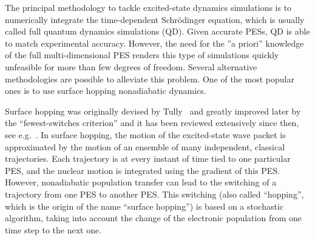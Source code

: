 \documentclass[a4paper,10pt,DIV=15,openany]{scrbook}
\begin{document}
The principal methodology to tackle excited-state dynamics simulations is to numerically integrate the time-dependent Schr\"odinger equation, which is usually called full quantum dynamics simulations (QD). Given accurate PESs, QD is able to match experimental accuracy. However, the need for the ''a priori'' knowledge of the full multi-dimensional PES renders this type of simulations quickly unfeasible for more than few degrees of freedom. Several alternative methodologies are possible to alleviate this problem. One of the most popular ones is to use surface hopping nonadiabatic dynamics.

Surface hopping was originally devised by Tully~\cite{Tully1971JCP} and greatly improved later by the ``fewest-switches criterion''\cite{Tully1990JCP} and it has been reviewed extensively since then, see e.g.~\cite{Barbatti2011WCMS,Subotnik2016ARPC,Wang2016JPCL,Doltsinis2006,Doltsinis2002JTCC}.
In surface hopping, the motion of the excited-state wave packet is approximated by the motion of an ensemble of many independent, classical trajectories. Each trajectory is at every instant of time tied to one particular PES, and the nuclear motion is integrated using the gradient of this PES. However, nonadiabatic population transfer can lead to the switching of a trajectory from one PES to another PES. This switching (also called ``hopping'', which is the origin of the name ``surface hopping'') is based on a stochastic algorithm, taking into account the change of the electronic population from one time step to the next one.
\end{document}
